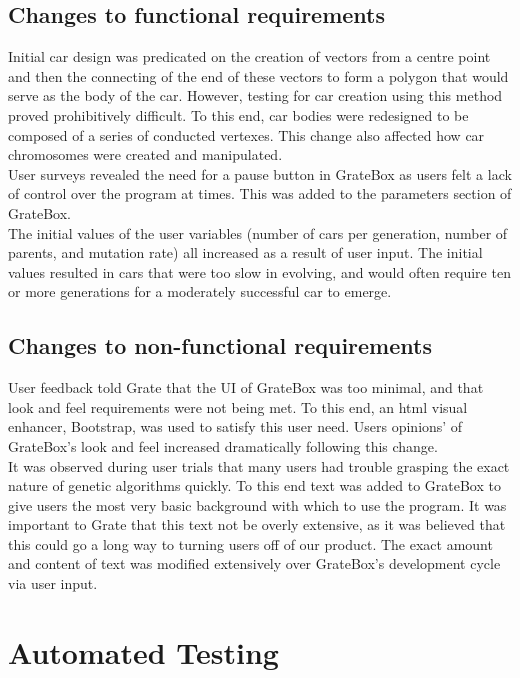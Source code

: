 \documentclass[12pt, titlepage]{article}
\begin{document}
\subsection{Changes to functional requirements}

Initial car design was predicated on the creation of vectors from a centre point 
and then the connecting of the end of these vectors to form a polygon that would 
serve as the body of the car. However, testing for car creation using this 
method proved prohibitively difficult. To this end, car bodies were redesigned 
to be composed of a series of conducted vertexes. This change also affected how 
car chromosomes were created and manipulated.\\

User surveys revealed the need for a pause button in GrateBox as users felt a 
lack of control over the program at times. This was added to the parameters 
section of GrateBox.\\

The initial values of the user variables (number of cars per generation, number 
of parents, and mutation rate) all increased as a result of user input. The 
initial values resulted in cars that were too slow in evolving, and would often 
require ten or more generations for a moderately successful car to emerge. 

\subsection{Changes to non-functional requirements}

User feedback told Grate that the UI of GrateBox was too minimal, and that look 
and feel requirements were not being met. To this end, an html visual enhancer, 
Bootstrap, was used to satisfy this user need. Users opinions' of GrateBox's 
look and feel increased dramatically following this change.\\

It was observed during user trials that many users had trouble grasping the 
exact nature of genetic algorithms quickly. To this end text was added to 
GrateBox to give users the most very basic background with which to use the 
program. It was important to Grate that this text not be overly extensive, as it 
was believed that this could go a long way to turning users off of our product. 
The exact amount and content of text was modified extensively over GrateBox's 
development cycle via user input.

\section{Automated Testing}
\end{document}
